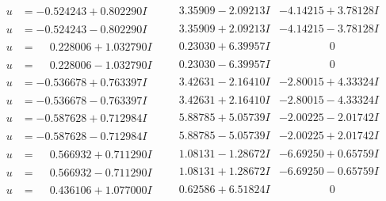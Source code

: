 \documentclass[1p]{elsarticle_modified}
\theoremstyle{definition}
\begin{document}
$$\begin{array}{c|c|c}
\begin{aligned}
u &= -0.524243 + 0.802290 I\end{aligned}
 & \phantom{-}3.35909 - 2.09213 I & -4.14215 + 3.78128 I \\ \hline\begin{aligned}
u &= -0.524243 - 0.802290 I\end{aligned}
 & \phantom{-}3.35909 + 2.09213 I & -4.14215 - 3.78128 I \\ \hline\begin{aligned}
u &= \phantom{-}0.228006 + 1.032790 I\end{aligned}
 & \phantom{-}0.23030 + 6.39957 I & \phantom{-0.000000 } 0 \\ \hline\begin{aligned}
u &= \phantom{-}0.228006 - 1.032790 I\end{aligned}
 & \phantom{-}0.23030 - 6.39957 I & \phantom{-0.000000 } 0 \\ \hline\begin{aligned}
u &= -0.536678 + 0.763397 I\end{aligned}
 & \phantom{-}3.42631 - 2.16410 I & -2.80015 + 4.33324 I \\ \hline\begin{aligned}
u &= -0.536678 - 0.763397 I\end{aligned}
 & \phantom{-}3.42631 + 2.16410 I & -2.80015 - 4.33324 I \\ \hline\begin{aligned}
u &= -0.587628 + 0.712984 I\end{aligned}
 & \phantom{-}5.88785 + 5.05739 I & -2.00225 - 2.01742 I \\ \hline\begin{aligned}
u &= -0.587628 - 0.712984 I\end{aligned}
 & \phantom{-}5.88785 - 5.05739 I & -2.00225 + 2.01742 I \\ \hline\begin{aligned}
u &= \phantom{-}0.566932 + 0.711290 I\end{aligned}
 & \phantom{-}1.08131 - 1.28672 I & -6.69250 + 0.65759 I \\ \hline\begin{aligned}
u &= \phantom{-}0.566932 - 0.711290 I\end{aligned}
 & \phantom{-}1.08131 + 1.28672 I & -6.69250 - 0.65759 I \\ \hline\begin{aligned}
u &= \phantom{-}0.436106 + 1.077000 I\end{aligned}
 & \phantom{-}0.62586 + 6.51824 I & \phantom{-0.000000 } 0 \\ \hline\begin{aligned}

\end{aligned}
\end{array}$$
\end{document}
